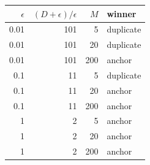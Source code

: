 \begin{tabular}{@{}rrrl@{}}
\toprule
$\epsilon$ & $(D+\epsilon)/\epsilon$ & $M$ & winner \\
\midrule
0.01 & 101 & 5 & duplicate \\
0.01 & 101 & 20 & duplicate \\
0.01 & 101 & 200 & anchor \\
0.1 & 11 & 5 & duplicate \\
0.1 & 11 & 20 & anchor \\
0.1 & 11 & 200 & anchor \\
1 & 2 & 5 & anchor \\
1 & 2 & 20 & anchor \\
1 & 2 & 200 & anchor \\
\bottomrule
\end{tabular}
